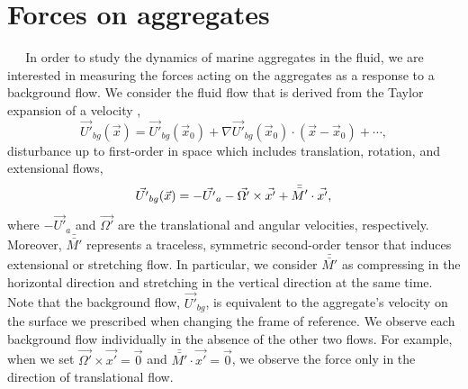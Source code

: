 \section{Forces on aggregates}
$\ \ \ \ \ $  
In order to study the dynamics of marine aggregates in the fluid, we are interested in measuring the forces acting on the aggregates as a response to a background flow. We consider the fluid  flow that is derived from the Taylor expansion of a velocity \cite{guazzelli_physical_2011},
\[
 \vec{U'}_{bg}(\vec{x})
  =  \vec{U'}_{bg}(\vec{x}_0) + 
  \nabla  \vec{U'}_{bg}(\vec{x}_0) \cdot (\vec{x} - \vec{x}_0) + \cdots,
\]
 disturbance up to first-order in space which includes translation, rotation, and extensional flows,
\begin{equation}
 \vec{U'}_{bg}(\vec{x}) = -\vec{U'}_a -  \vec{\Omega'} \times \vec{x'}+\Bar{\Bar{M'}} \cdot \vec{x'},
 \label{eq_bg_flow}
\end{equation}
where $-\vec{U'}_a$ and $\vec{\Omega'}$ are the translational and angular velocities, respectively. 
Moreover, $\bar{\bar{M'}}$ represents a traceless, symmetric second-order tensor that induces extensional or stretching flow. In particular, we consider $\bar{\bar{M'}}$ as compressing in the horizontal direction and stretching in the vertical direction at the same time. 
Note that the background flow, $\vec{U'}_{bg}$, is equivalent to the aggregate's velocity on the surface we prescribed when changing the frame of reference.
We observe each background flow individually in the absence of the other two flows. For example, when we set $\vec{\Omega'} \times \vec{x'} = \vec{0}$ and $\bar{\bar{M'}} \cdot \vec{x'} = \vec{0}$, we observe the force only in the direction of translational flow. 




